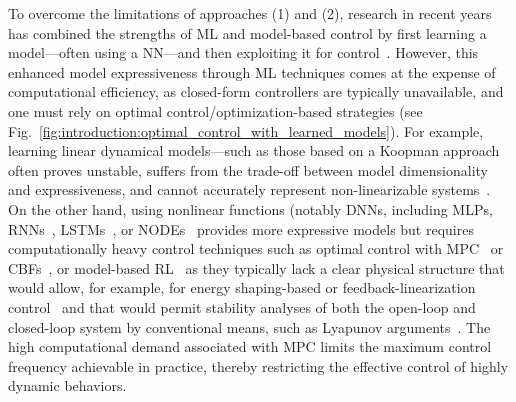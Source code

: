 To overcome the limitations of approaches (1) and (2), research in recent years has combined the strengths of \gls{ML} and model-based control by first learning a model—often using a \gls{NN}—and then exploiting it for control~\citep{gillespie2018learning, thuruthel2018model, bruder2020data, bruder2024koopman, alora2023data, alora2023robust, chen2024data}. However, this enhanced model expressiveness through \gls{ML} techniques comes at the expense of computational efficiency, as closed-form controllers are typically unavailable, and one must rely on optimal control/optimization-based strategies (see Fig.~\ref{fig:introduction:optimal_control_with_learned_models}).
For example, learning linear dynamical models—such as those based on a Koopman approach~\citep{bruder2020data, bruder2024koopman} often proves unstable, suffers from the trade-off between model dimensionality and expressiveness, and cannot accurately represent non-linearizable systems~\citep{cenedese2022data}. On the other hand, using nonlinear functions (notably \glspl{DNN}, including \glspl{MLP}, \glspl{RNN}~\citep{thuruthel2018model, sun2022physics}, \glspl{LSTM}~\citep{xie2023dynamic}, or \glspl{NODE}~\citep{kasaei2023data} provides more expressive models but requires computationally heavy control techniques such as optimal control with \gls{MPC}~\citep{gillespie2018learning, aswani2013provably, kabzan2019learning, hewing2020learning, alora2023data, alora2023robust} or \glspl{CBF}~\citep{taylor2020learning}, or model-based \gls{RL}~\citep{thuruthel2018model} as they typically lack a clear physical structure that would allow, for example, for energy shaping-based or feedback-linearization control~\citep{khalil2002nonlinear} and that would permit stability analyses of both the open-loop and closed-loop system by conventional means, such as Lyapunov arguments~\citep{khalil2002nonlinear}. 
The high computational demand associated with \gls{MPC} limits the maximum control frequency achievable in practice, thereby restricting the effective control of highly dynamic behaviors.

